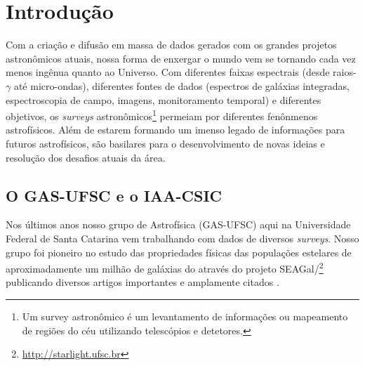 


\chapter{Introdução}
\label{sec:intro}

Com a criação e difusão em massa de dados gerados com os grandes projetos astronômicos atuais, nossa
forma de enxergar o mundo vem se tornando cada vez menos ingênua quanto ao Universo. Com diferentes
faixas espectrais (desde raios-$\gamma$ até micro-ondas), diferentes fontes de dados (espectros de
galáxias integradas, espectroscopia de campo, imagens, monitoramento temporal) e diferentes
objetivos, os {\em surveys} astronômicos\footnote{Um survey astronômico é um levantamento de
informações ou mapeamento de regiões do céu utilizando telescópios e detetores.} permeiam por
diferentes fenônmenos astrofísicos. Além de estarem formando um imenso legado de informações para
futuros astrofísicos, são basilares para o desenvolvimento de novas ideias e resolução dos desafios
atuais da área.
 
\section{O GAS-UFSC e o IAA-CSIC}
\label{sec:intro:UFSCeIAA}

Nos últimos anos nosso grupo de Astrofísica (GAS-UFSC) aqui na Universidade Federal de Santa
Catarina vem trabalhando com dados de diversos {\em surveys}. Nosso grupo foi pioneiro no estudo das
propriedades físicas das populações estelares de aproximadamente um milhão de galáxias do \SDSS
através do projeto
SEAGal/\STARLIGHT\footnote{\href{http://starlight.ufsc.br}{http://starlight.ufsc.br}} publicando
diversos artigos importantes e amplamente citados \citep[e.g., ][]{CidFernandes.etal.2005a,
Mateus.etal.2006a, Stasinska.etal.2006a, Asari.etal.2007a, Stasinska.etal.2008a,
CidFernandes.etal.2011a}.

